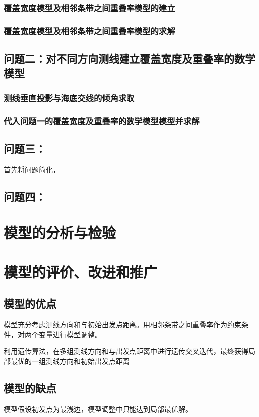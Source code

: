 \documentclass[withoutpreface,bwprint]{cumcmthesis} %
\begin{document}
\subsubsection{覆盖宽度模型及相邻条带之间重叠率模型的建立}

\subsubsection{覆盖宽度模型及相邻条带之间重叠率模型的求解}

\subsection{问题二：对不同方向测线建立覆盖宽度及重叠率的数学模型}

\subsubsection{测线垂直投影与海底交线的倾角求取}

\subsubsection{代入问题一的覆盖宽度及重叠率的数学模型模型并求解}

\subsection{问题三：}
首先将问题简化，

\subsection{问题四：}

\section{模型的分析与检验}
\section{模型的评价、改进和推广}
\subsection{模型的优点}
模型充分考虑测线方向和与初始出发点距离。用相邻条带之间重叠率作为约束条件，对两个变量进行模型调整。

利用遗传算法，在多组测线方向和与出发点距离中进行遗传交叉迭代，最终获得局部最优的一组测线方向和初始出发点距离
\subsection{模型的缺点}
模型假设初发点为最浅边，模型调整中只能达到局部最优解。
\end{document}
